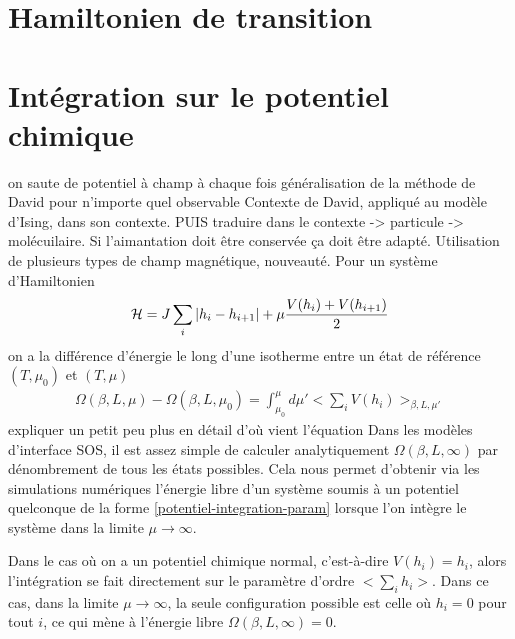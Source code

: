 \section{Hamiltonien de transition}
\label{sec-transition}
\section{Intégration sur le potentiel chimique}
{\color{red} on saute de potentiel à champ à chaque fois
généralisation de la méthode de David pour n'importe quel observable
Contexte de David, appliqué au modèle d'Ising, dans son contexte.
PUIS traduire dans le contexte -> particule -> molécuilaire. 
 Si l'aimantation doit être conservée ça doit être adapté. Utilisation de plusieurs types de champ magnétique, nouveauté.}
Pour un système d'Hamiltonien 
\begin{align}
    \mathcal{H} = J \sum_i |h_i-h_{i+1}| + \mu \frac{V(h_i)+V(h_{i+1})}{2}
    \label{potentiel-integration-param}
\end{align}
on a la différence d'énergie le long d'une isotherme entre un état de référence $(T,\mu_0)$ et $(T,\mu)$ \cite{lopes_cardozo_critical_2014}
\begin{align}
   \Omega(\beta,L,\mu) - \Omega(\beta,L,\mu_0) = \int_{\mu_0}^\mu d\mu'  < \sum_i V(h_i) >_{\beta,L,\mu'} 
\end{align}
{\color{red} expliquer un petit peu plus en détail d'où vient l'équation}
Dans les modèles d'interface SOS, il est assez simple de calculer analytiquement $\Omega(\beta,L,\infty)$ par dénombrement de tous les états possibles. Cela nous permet d'obtenir via les simulations numériques l'énergie libre d'un système soumis à un potentiel quelconque de la forme \ref{potentiel-integration-param} lorsque l'on intègre le système dans la limite $\mu \to \infty$.

Dans le cas où on a un potentiel chimique normal, c'est-à-dire $V(h_i)= h_i$, alors l'intégration se fait directement sur le paramètre d'ordre $<\sum_i h_i>$. Dans ce cas, dans la limite $\mu \to \infty$, la seule configuration possible est celle où $h_i=0$ pour tout $i$, ce qui mène à l'énergie libre $\Omega(\beta,L,\infty) = 0$. 

